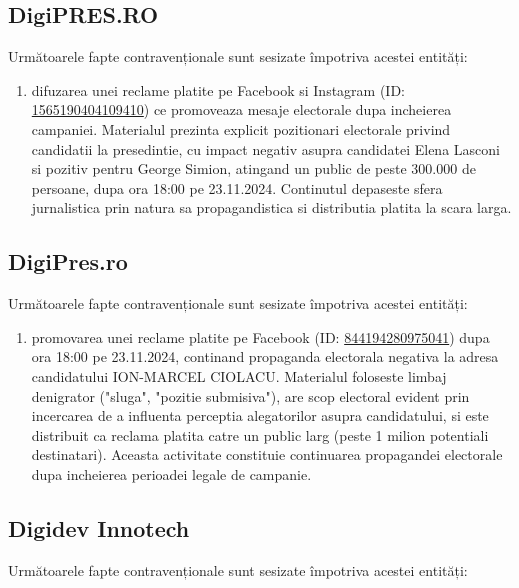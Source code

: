 \documentclass[a4paper,12pt]{article}
\begin{document}
\vspace{0.5cm}

\subsection{DigiPRES.RO}
Următoarele fapte contravenționale sunt sesizate împotriva acestei entități:

\begin{enumerate}[leftmargin=*, label=\arabic*.)]
    \item difuzarea unei reclame platite pe Facebook si Instagram (ID: \href{https://www.facebook.com/ads/library/?id=1565190404109410}{1565190404109410}) ce promoveaza mesaje electorale dupa incheierea campaniei. Materialul prezinta explicit pozitionari electorale privind candidatii la presedintie, cu impact negativ asupra candidatei Elena Lasconi si pozitiv pentru George Simion, atingand un public de peste 300.000 de persoane, dupa ora 18:00 pe 23.11.2024. Continutul depaseste sfera jurnalistica prin natura sa propagandistica si distributia platita la scara larga.
\end{enumerate}

\vspace{0.5cm}

\subsection{DigiPres.ro}
Următoarele fapte contravenționale sunt sesizate împotriva acestei entități:

\begin{enumerate}[leftmargin=*, label=\arabic*.)]
    \item promovarea unei reclame platite pe Facebook (ID: \href{https://www.facebook.com/ads/library/?id=844194280975041}{844194280975041}) dupa ora 18:00 pe 23.11.2024, continand propaganda electorala negativa la adresa candidatului ION-MARCEL CIOLACU. Materialul foloseste limbaj denigrator ("sluga", "pozitie submisiva"), are scop electoral evident prin incercarea de a influenta perceptia alegatorilor asupra candidatului, si este distribuit ca reclama platita catre un public larg (peste 1 milion potentiali destinatari). Aceasta activitate constituie continuarea propagandei electorale dupa incheierea perioadei legale de campanie.
\end{enumerate}

\vspace{0.5cm}

\subsection{Digidev Innotech}
Următoarele fapte contravenționale sunt sesizate împotriva acestei entități:
\end{document}
